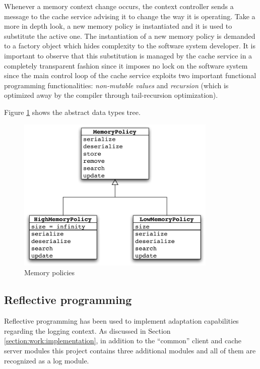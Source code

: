\documentclass[11pt,a4paper]{article}
\begin{document}
Whenever a memory context change occurs, the context controller sends a message to the cache service advising it to change the way it is operating. Take a more in depth look, a new memory policy is instantiated and it is used to substitute the active one. The instantiation of a new memory policy is demanded to a factory object which hides complexity to the software system developer. It is important to observe that this substitution is managed by the cache service in a completely transparent fashion since it imposes no lock on the software system since the main control loop of the cache service exploits two important functional programming functionalities: \emph{non-mutable values} and  \emph{recursion} (which is optimized away by the compiler through tail-recursion optimization).

Figure \ref{figure:memory-policies} shows the abstract data types tree.

\begin{figure}
\begin{center}
\includegraphics[width=0.85\textwidth]{figures/Memory-Policies.pdf}
\caption{Memory policies}
\label{figure:memory-policies}
\end{center}
\end{figure}

\subsection{Reflective programming}
\label{section:functionalities:reflection}
Reflective programming has been used to implement adaptation capabilities regarding the logging context. As discussed in Section \ref{section:work:implementation}, in addition to the ``common'' client and cache server modules this project contains three additional modules and all of them are recognized as a log module.
\end{document}
